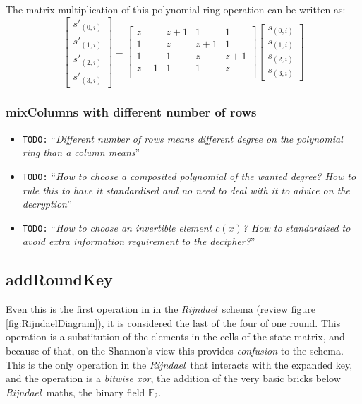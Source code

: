 \documentclass[10pt,a4paper,twoside]{llncs}
\newcommand{\todo}[1]{\texttt{\color{red}TODO:} ``\emph{#1}''}
\newcommand{\rijndael}{\emph{Rijndael}}
\begin{document}
The matrix multiplication of this polynomial ring operation can be written as:
\begin{equation}\label{eq:MDS}
  \begin{bmatrix}
    s'_{(0,i)}\\s'_{(1,i)}\\s'_{(2,i)}\\s'_{(3,i)}
  \end{bmatrix}
  =
  \begin{bmatrix}
    z & z+1 & 1 & 1 \\
    1 & z & z+1 & 1 \\
    1 & 1 & z & z+1 \\
    z+1 & 1 & 1 & z \\
  \end{bmatrix}
  \begin{bmatrix}
    s_{(0,i)}\\s_{(1,i)}\\s_{(2,i)}\\s_{(3,i)}
  \end{bmatrix}
\end{equation}

\subsubsection{mixColumns with different number of rows}

\begin{itemize}
 \item \todo{Different number of rows means different degree on the polynomial ring than a column means}
 \item \todo{How to choose a composited polynomial of the wanted degree? How to rule this to have it standardised and no need to deal with it to advice on the decryption}
 \item \todo{How to choose an invertible element $c(x)$? How to standardised to avoid extra information requirement to the decipher?}
\end{itemize}

\subsection{addRoundKey}\label{sec:addRoundKey}

Even this is the first operation in in the \rijndael\, schema (review figure \ref{fig:RijndaelDiagram}), it is considered the last of the four of one round. This operation is a substitution of the elements in the cells of the state matrix, and because of that, on the Shannon's view this provides \emph{confusion} to the schema. This is the only operation in the \rijndael\, that interacts with the expanded key, and the operation is a \emph{bitwise xor}, the addition of the very basic bricks below \rijndael\, maths, the binary field $\mathbb{F}_{2}$.
\end{document}
